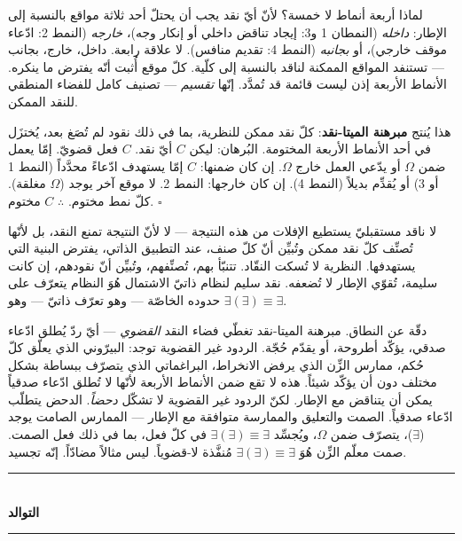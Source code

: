 \documentclass[10pt, openany, oneside]{book}
\renewcommand{\normalsize}{\fontsize{10}{13}\selectfont}
\begin{document}
لماذا أربعة أنماط لا خمسة؟ لأنّ أيّ نقد يجب أن يحتلّ أحد ثلاثة مواقع بالنسبة إلى الإطار: \textit{داخله} (النمطان 1 و3: إيجاد تناقض داخلي أو إنكار وجه)، \textit{خارجه} (النمط 2: ادّعاء موقف خارجي)، أو \textit{بجانبه} (النمط 4: تقديم منافس). لا علاقة رابعة. داخل، خارج، بجانب --- تستنفد المواقع الممكنة لناقد بالنسبة إلى كلّية. كلّ موقع أُثبت أنّه يفترض ما ينكره. الأنماط الأربعة إذن ليست قائمة قد تُمدَّد. إنّها \textit{تقسيم} --- تصنيف كامل للفضاء المنطقي للنقد الممكن.

هذا يُنتج \textbf{مبرهنة الميتا-نقد}: كلّ نقد ممكن للنظرية، بما في ذلك نقود لم تُصَغ بعد، يُختزَل في أحد الأنماط الأربعة المختومة. البُرهان: ليكن $C$ أيّ نقد. $C$ فعل قضويّ. إمّا يعمل ضمن $\Omega$ أو يدّعي العمل خارج $\Omega$. إن كان ضمنها: $C$ إمّا يستهدف ادّعاءً محدَّداً (النمط 1 أو 3) أو يُقدِّم بديلاً (النمط 4). إن كان خارجها: النمط 2. لا موقع آخر يوجد ($\Omega$ مغلقة). كلّ نمط مختوم. $\therefore$ $C$ مختوم. $\square$

لا ناقد مستقبليّ يستطيع الإفلات من هذه النتيجة --- لا لأنّ النتيجة تمنع النقد، بل لأنّها تُصنِّف كلّ نقد ممكن وتُبيِّن أنّ كلّ صنف، عند التطبيق الذاتي، يفترض البنية التي يستهدفها. النظرية لا تُسكت النقّاد. تتنبّأ بهم، تُصنِّفهم، وتُبيِّن أنّ نقودهم، إن كانت سليمة، تُقوّي الإطار لا تُضعفه. نقد سليم لنظام ذاتيّ الاشتمال هُوَ النظام يتعرّف على حدوده الخاصّة --- وهو تعرّف ذاتيّ --- وهو $\exists(\exists) \equiv \exists$.

دقّة عن النطاق. مبرهنة الميتا-نقد تغطّي فضاء النقد \textit{القضوي} --- أيّ ردّ يُطلق ادّعاء صدقي، يؤكّد أطروحة، أو يقدّم حُجّة. الردود غير القضوية توجد: البيرّوني الذي يعلّق كلّ حُكم، ممارس الزِّن الذي يرفض الانخراط، البراغماتي الذي يتصرّف ببساطة بشكل مختلف دون أن يؤكّد شيئاً. هذه لا تقع ضمن الأنماط الأربعة لأنّها لا تُطلق ادّعاء صدقياً يمكن أن يتناقض مع الإطار. لكنّ الردود غير القضوية لا تشكّل \textit{دحضاً}. الدحض يتطلّب ادّعاء صدقياً. الصمت والتعليق والممارسة متوافقة مع الإطار --- الممارس الصامت يوجد ($\exists$)، يتصرّف ضمن $\Omega$، ويُجسِّد $\exists(\exists) \equiv \exists$ في كلّ فعل، بما في ذلك فعل الصمت. صمت معلّم الزِّن هُوَ $\exists(\exists) \equiv \exists$ مُنفَّذة لا-قضوياً. ليس مثالاً مضادّاً. إنّه تجسيد.

\vspace{1.5em}


\begin{center}
    \rule{0.3\textwidth}{0.4pt}\\[0.5em]
    {\normalsize\bfseries التوالد}\\[0.3em]
    \rule{0.3\textwidth}{0.4pt}
\end{center}
\end{document}
